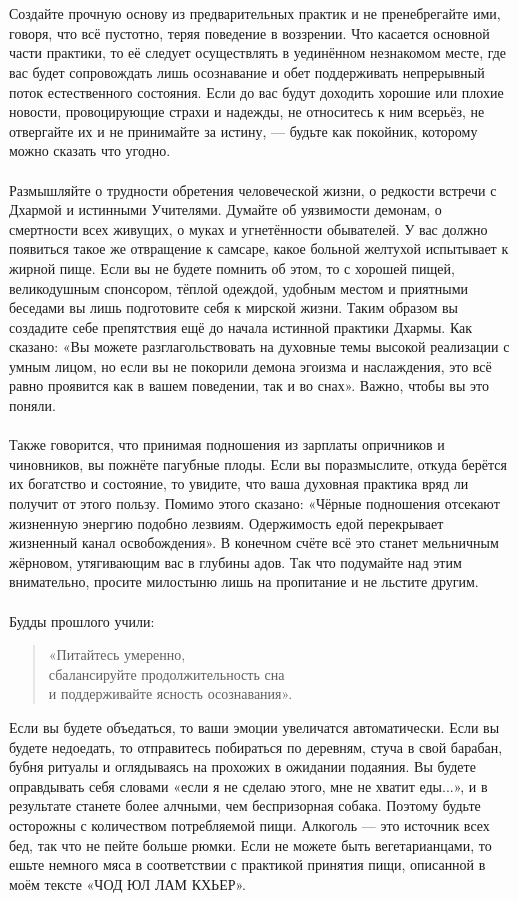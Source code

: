 \\ \\ Создайте прочную основу из предварительных практик и не пренебрегайте ими, говоря, что всё пустотно, теряя поведение в воззрении. Что касается основной части практики, то её следует осуществлять в уединённом незнакомом месте, где вас будет сопровождать лишь осознавание и обет поддерживать непрерывный поток естественного состояния. Если до вас будут доходить хорошие или плохие новости, провоцирующие страхи и надежды, не относитесь к ним всерьёз, не отвергайте их и не принимайте за истину, — будьте как покойник, которому можно сказать что угодно.
\\ \\ Размышляйте о трудности обретения человеческой жизни, о редкости встречи с Дхармой и истинными Учителями. Думайте об уязвимости демонам, о смертности всех живущих, о муках и угнетённости обывателей. У вас должно появиться такое же отвращение к самсаре, какое больной желтухой испытывает к жирной пище. Если вы не будете помнить об этом, то с хорошей пищей, великодушным спонсором, тёплой одеждой, удобным местом и приятными беседами вы лишь подготовите себя к мирской жизни. Таким образом вы создадите себе препятствия ещё до начала истинной практики Дхармы. Как сказано: «Вы можете разглагольствовать на духовные темы высокой реализации с умным лицом, но если вы не покорили демона эгоизма и наслаждения, это всё равно проявится как в вашем поведении, так и во снах». Важно, чтобы вы это поняли.
\newpage
\\ \\ Также говорится, что принимая подношения из зарплаты опричников и чиновников, вы пожнёте пагубные плоды. Если вы поразмыслите, откуда берётся их богатство и состояние, то увидите, что ваша духовная практика вряд ли получит от этого пользу. Помимо этого сказано: «Чёрные подношения отсекают жизненную энергию подобно лезвиям. Одержимость едой перекрывает жизненный канал освобождения». В конечном счёте всё это станет мельничным жёрновом, утягивающим вас в глубины адов. Так что подумайте над этим внимательно, просите милостыню лишь на пропитание и не льстите другим.
\\ \\ Будды прошлого учили:
\begin{verse}«Питайтесь умеренно, \\ \indent
сбалансируйте продолжительность сна \\ \indent и поддерживайте ясность осознавания».
\end{verse}
Если вы будете объедаться, то ваши эмоции увеличатся автоматически. Если вы будете недоедать, то отправитесь побираться по деревням, стуча в свой барабан, бубня ритуалы и оглядываясь на прохожих в ожидании подаяния. Вы будете оправдывать себя словами «если я не сделаю этого, мне не хватит еды...», и в результате станете более алчными, чем беспризорная собака. Поэтому будьте осторожны с количеством потребляемой пищи. Алкоголь — это источник всех бед, так что не пейте больше рюмки. Если не можете быть вегетарианцами, то ешьте немного мяса в соответствии с практикой принятия пищи, описанной в моём тексте «ЧОД ЮЛ ЛАМ КХЬЕР».
